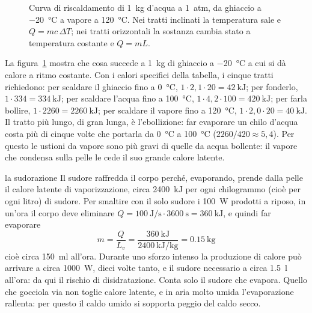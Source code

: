 \begin{figure}[h]
\centering

\caption{Curva di riscaldamento di \SI{1}{\kilo\gram} d'acqua a \SI{1}{atm}, da ghiaccio a \SI{-20}{\celsius} a vapore a \SI{120}{\celsius}. Nei tratti inclinati la temperatura sale e $Q = mc\,\Delta T$; nei tratti orizzontali la sostanza cambia stato a temperatura costante e $Q = mL$.}
\label{fig:ud5-riscaldamento}
\end{figure}

La figura~\ref{fig:ud5-riscaldamento} mostra che cosa succede a \SI{1}{\kilo\gram} di ghiaccio a \SI{-20}{\celsius} a cui si dà calore a ritmo costante. Con i calori specifici della tabella, i cinque tratti richiedono: per scaldare il ghiaccio fino a \SI{0}{\celsius}, $1 \cdot 2{,}1 \cdot 20 = \SI{42}{\kilo\joule}$; per fonderlo, $1 \cdot 334 = \SI{334}{\kilo\joule}$; per scaldare l'acqua fino a \SI{100}{\celsius}, $1 \cdot 4{,}2 \cdot 100 = \SI{420}{\kilo\joule}$; per farla bollire, $1 \cdot 2260 = \SI{2260}{\kilo\joule}$; per scaldare il vapore fino a \SI{120}{\celsius}, $1 \cdot 2{,}0 \cdot 20 = \SI{40}{\kilo\joule}$.
Il tratto più lungo, di gran lunga, è l'ebollizione: far evaporare un chilo d'acqua costa più di cinque volte che portarla da \SI{0}{\celsius} a \SI{100}{\celsius} ($2260/420 \approx 5{,}4$). Per questo le ustioni da vapore sono più gravi di quelle da acqua bollente: il vapore che condensa sulla pelle le cede il suo grande calore latente.

\begin{applicazione}{la sudorazione}
Il sudore raffredda il corpo perché, evaporando, prende dalla pelle il calore latente di vaporizzazione, circa \SI{2400}{\kilo\joule} per ogni chilogrammo (cioè per ogni litro) di sudore. Per smaltire con il solo sudore i \SI{100}{\watt} prodotti a riposo, in un'ora il corpo deve eliminare $Q = \SI{100}{\joule\per\second} \cdot \SI{3600}{\second} = \SI{360}{\kilo\joule}$, e quindi far evaporare
\[
  m = \frac{Q}{L_v} = \frac{\SI{360}{\kilo\joule}}{\SI{2400}{\kilo\joule\per\kilo\gram}} = \SI{0,15}{\kilo\gram}
\]
cioè circa \SI{150}{\milli\litre} all'ora. Durante uno sforzo intenso la produzione di calore può arrivare a circa \SI{1000}{\watt}, dieci volte tanto, e il sudore necessario a circa \SI{1,5}{\litre} all'ora: da qui il rischio di disidratazione. Conta solo il sudore che evapora. Quello che gocciola via non toglie calore latente, e in aria molto umida l'evaporazione rallenta: per questo il caldo umido si sopporta peggio del caldo secco.
\end{applicazione}

